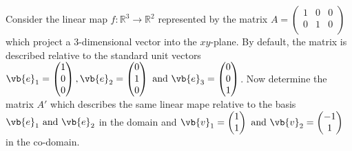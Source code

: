 \documentclass[a4paper,12pt]{report}
\begin{document}
{Consider the linear map \(f:\mathbb{R}^3 \to \mathbb{R}^2\) represented by the matrix \(A = \begin{pmatrix}
    1 & 0 &  0 \\
    0 & 1 &  0 \\
\end{pmatrix}\) which project a 3-dimensional vector into the \(xy\)-plane. By default, the matrix is described relative to the standard unit vectors \(\vb{e} _{1} = \begin{pmatrix}
     1 \\
     0 \\
     0 \\
\end{pmatrix}, \vb{e} _{2} = \begin{pmatrix}
     0 \\
     1 \\
     0 \\
\end{pmatrix} \text { and } \vb{e} _{3} = \begin{pmatrix}
     0 \\
     0 \\
     1 \\
\end{pmatrix}\). Now determine the matrix \(A'\) which describes the same linear mape relative to the basis \(\vb{e} _{1}\text { and } \vb{e} _{2}  \) in the domain and \(\vb{v} _{1} = \begin{pmatrix}
     1 \\
     1 \\
\end{pmatrix} \text { and } \vb{v} _{2} = \begin{pmatrix}
     -1 \\
     1 \\
\end{pmatrix} \) in the co-domain.    }
\end{document}
